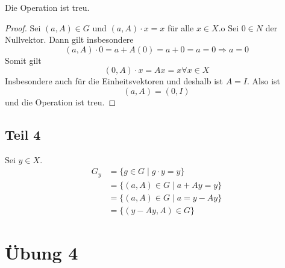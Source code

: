 \documentclass[10pt,a4paper]{article}
\begin{document}
Die Operation ist treu.
\begin{proof}
  Sei $(a, A) \in G$ und $(a, A) \cdot x = x$ für alle $x \in X$.o
  Sei $0 \in N$ der Nullvektor.
  Dann gilt insbesondere
  \begin{equation}
    (a, A) \cdot 0 = a + A(0) = a + 0 = a = 0 \Rightarrow a = 0
  \end{equation}
  Somit gilt
  \begin{equation}
    (0, A) \cdot x = Ax = x \forall x \in X
  \end{equation}
  Insbesondere auch für die Einheitsvektoren und deshalb ist $A = I$.
  Also ist
  \begin{equation}
    (a, A) = (0, I)
  \end{equation}
  und die Operation ist treu.
\end{proof}

\subsection{Teil 4}

Sei $y \in X$.
\begin{align*}
  G_{y} & = \{ g \in G \mid g \cdot y = y \}\\
  & = \{ (a, A) \in G \mid a + Ay = y \}\\
  & = \{ (a, A) \in G \mid a = y - Ay \}\\
  & = \{ (y - Ay, A) \in G \}
\end{align*}

\section{Übung 4}
\end{document}
